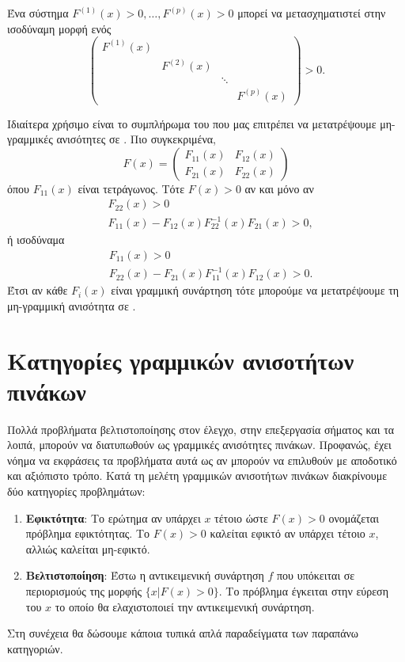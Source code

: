 Ένα σύστημα  \( F^{(1)}(x) > 0, \dots, F^{(p)}(x) > 0 \) μπορεί να
μετασχηματιστεί στην ισοδύναμη μορφή ενός 
\begin{equation*}
    \begin{pmatrix}
        F^{(1)}(x) & {} & {} & {}\\
        {} & F^{(2)}(x) & {} & {}\\
        {} & {} & \ddots & {} \\
        {} & {} & {} & F^{(p)}(x)
    \end{pmatrix} > 0.
\end{equation*}

Ιδιαίτερα χρήσιμο είναι το συμπλήρωμα του  που μας επιτρέπει να
μετατρέψουμε μη-γραμμικές ανισότητες σε . Πιο συγκεκριμένα,
\begin{equation*}
    F(x) =
    \begin{pmatrix}
        F_{11}(x) & F_{12}(x) \\
        F_{21}(x) & F_{22}(x)
    \end{pmatrix}
\end{equation*}
όπου \(F_{11}(x)\) είναι τετράγωνος. Τότε \(F(x) > 0\) αν και μόνο αν
\begin{align*}
    &F_{22}(x) > 0 \\
    &F_{11}(x) - F_{12}(x)F_{22}^{-1}(x)F_{21}(x) > 0,
\end{align*}
ή ισοδύναμα
\begin{align*}
    &F_{11}(x) > 0 \\
    &F_{22}(x) - F_{21}(x)F_{11}^{-1}(x)F_{12}(x) > 0.
\end{align*}
Έτσι αν κάθε \(F_i(x)\) είναι γραμμική συνάρτηση τότε μπορούμε να μετατρέψουμε
τη μη-γραμμική ανισότητα σε .

\section{Κατηγορίες γραμμικών ανισοτήτων πινάκων}
Πολλά προβλήματα βελτιστοποίησης στον έλεγχο, στην επεξεργασία σήματος και τα
λοιπά, μπορούν να διατυπωθούν ως γραμμικές ανισότητες πινάκων. Προφανώς, έχει
νόημα να εκφράσεις τα προβλήματα αυτά ως  αν μπορούν να επιλυθούν με
αποδοτικό και αξιόπιστο τρόπο. Κατά τη μελέτη γραμμικών ανισοτήτων πινάκων
διακρίνουμε δύο κατηγορίες προβλημάτων:
\begin{enumerate}
    \item \textbf{Εφικτότητα}: Το ερώτημα αν υπάρχει \(x\) τέτοιο ώστε \(F(x) >
        0 \) ονομάζεται πρόβλημα εφικτότητας. Το  \(F(x) > 0 \)
        καλείται εφικτό αν υπάρχει τέτοιο \(x\), αλλιώς καλείται μη-εφικτό.
    \item \textbf{Βελτιστοποίηση}: Έστω η αντικειμενική συνάρτηση \(f\) που
        υπόκειται σε περιορισμούς της μορφής \( \{ x | F(x) > 0 \} \). Το
        πρόβλημα έγκειται στην εύρεση του \(x\) το οποίο θα ελαχιστοποιεί την
        αντικειμενική συνάρτηση.
\end{enumerate}
Στη συνέχεια θα δώσουμε κάποια τυπικά απλά παραδείγματα των παραπάνω
κατηγοριών.


